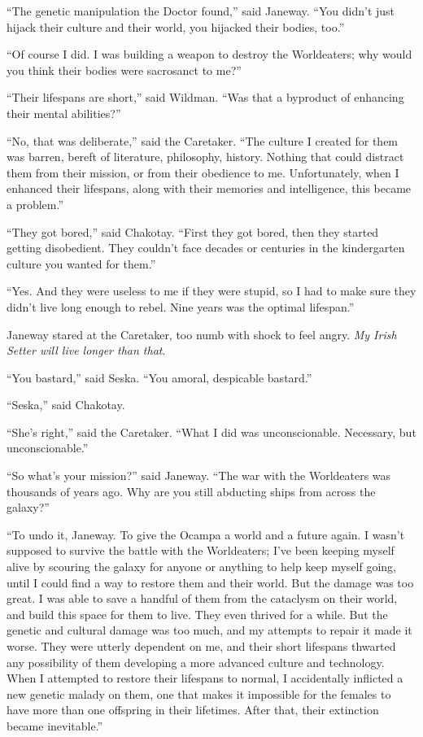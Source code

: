 \documentclass[twoside,letterpaper,12pt]{memoir}
\begin{document}
``The genetic manipulation the Doctor found,” said Janeway. ``You didn’t just hijack their culture and their world, you hijacked their bodies, too.” 

``Of course I did. I was building a weapon to destroy the Worldeaters; why would you think their bodies were sacrosanct to me?” 

``Their lifespans are short,” said Wildman. ``Was that a byproduct of enhancing their mental abilities?” 

``No, that was deliberate,” said the Caretaker. ``The culture I created for them was barren, bereft of literature, philosophy, history. Nothing that could distract them from their mission, or from their obedience to me. Unfortunately, when I enhanced their lifespans, along with their memories and intelligence, this became a problem.” 

``They got bored,” said Chakotay. ``First they got bored, then they started getting disobedient. They couldn’t face decades or centuries in the kindergarten culture you wanted for them.” 

``Yes. And they were useless to me if they were stupid, so I had to make sure they didn’t live long enough to rebel. Nine years was the optimal lifespan.” 

Janeway stared at the Caretaker, too numb with shock to feel angry. \textit{My Irish Setter will live longer than that}. 

``You bastard,” said Seska. ``You amoral, despicable bastard.” 

``Seska,” said Chakotay. 

``She’s right,” said the Caretaker. ``What I did was unconscionable. Necessary, but unconscionable.” 

``So what’s your mission?” said Janeway. ``The war with the Worldeaters was thousands of years ago. Why are you still abducting ships from across the galaxy?” 

``To undo it, Janeway. To give the Ocampa a world and a future again. I wasn’t supposed to survive the battle with the Worldeaters; I’ve been keeping myself alive by scouring the galaxy for anyone or anything to help keep myself going, until I could find a way to restore them and their world. But the damage was too great. I was able to save a handful of them from the cataclysm on their world, and build this space for them to live. They even thrived for a while. But the genetic and cultural damage was too much, and my attempts to repair it made it worse. They were utterly dependent on me, and their short lifespans thwarted any possibility of them developing a more advanced culture and technology. When I attempted to restore their lifespans to normal, I accidentally inflicted a new genetic malady on them, one that makes it impossible for the females to have more than one offspring in their lifetimes. After that, their extinction became inevitable.” 
\end{document}
